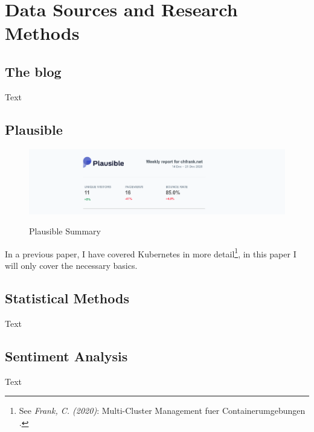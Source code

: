 %
%

\pagebreak
\section{Data Sources and Research Methods}

\onehalfspacing

\subsection{The blog}

Text

\subsection{Plausible}

\begin{figure}[H]
\centering
\caption {Plausible Summary}
\includegraphics[width=\linewidth]{images/plausible.png}
\label{fig:plausibleSummary}
\end{figure}

In a previous paper, I have covered Kubernetes in more detail\footnote{See \textit{Frank, C. (2020)}: Multi-Cluster Management fuer Containerumgebungen .\cite{previousPaper}}, in this paper I will only cover the necessary basics.

\subsection{Statistical Methods}

Text

\subsection{Sentiment Analysis}

Text

